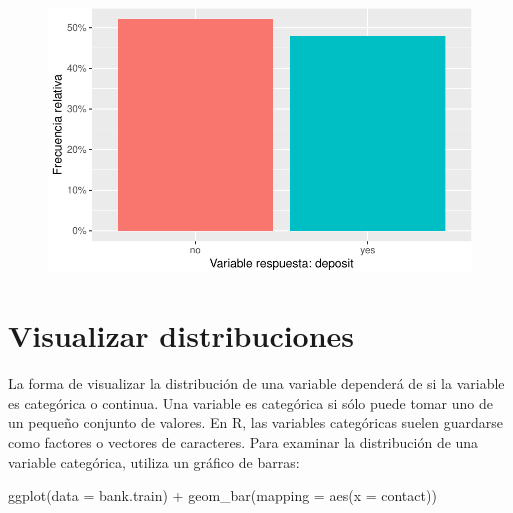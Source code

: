 \documentclass[
  letterpaper,
  DIV=11,
  numbers=noendperiod]{scrreprt}
\newenvironment{Shaded}{\begin{snugshade}}{\end{snugshade}}
\newcommand{\AttributeTok}[1]{\textcolor[rgb]{0.40,0.45,0.13}{#1}}
\newcommand{\FunctionTok}[1]{\textcolor[rgb]{0.28,0.35,0.67}{#1}}
\newcommand{\NormalTok}[1]{\textcolor[rgb]{0.00,0.23,0.31}{#1}}
\newcommand{\SpecialCharTok}[1]{\textcolor[rgb]{0.37,0.37,0.37}{#1}}
\begin{document}
\begin{figure}[H]

{\centering \includegraphics{eda_files/figure-pdf/variable_objetivo-1.pdf}

}

\end{figure}

\hypertarget{visualizar-distribuciones}{%
\section{Visualizar distribuciones}\label{visualizar-distribuciones}}

La forma de visualizar la distribución de una variable dependerá de si
la variable es categórica o continua. Una variable es categórica si sólo
puede tomar uno de un pequeño conjunto de valores. En R, las variables
categóricas suelen guardarse como factores o vectores de caracteres.
Para examinar la distribución de una variable categórica, utiliza un
gráfico de barras:

\begin{Shaded}
\begin{Highlighting}[]
\FunctionTok{ggplot}\NormalTok{(}\AttributeTok{data =}\NormalTok{ bank.train) }\SpecialCharTok{+}
  \FunctionTok{geom\_bar}\NormalTok{(}\AttributeTok{mapping =} \FunctionTok{aes}\NormalTok{(}\AttributeTok{x =}\NormalTok{ contact))}
\end{Highlighting}
\end{Shaded}
\end{document}
